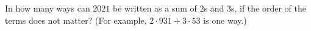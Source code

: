 In how many ways can $2021$ be written as a sum of $2$s and $3$s, if the order of the terms does not matter? (For example, $2\cdot931+3\cdot53$ is one way.)
